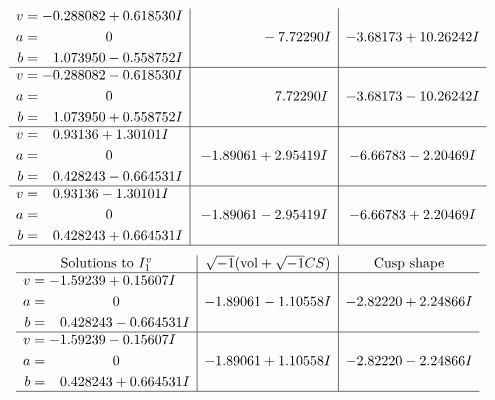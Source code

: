 \documentclass[1p]{elsarticle_modified}
\theoremstyle{definition}
\newcommand{\I}{\sqrt{-1}}
\begin{document}
$$\begin{array}{c|c|c}
\begin{aligned}
v &= -0.288082 + 0.618530 I \\
a &= \phantom{-0.000000 } 0 \\
b &= \phantom{-}1.073950 - 0.558752 I\end{aligned}
 & \phantom{-0.000000 } -7.72290 I & -3.68173 + 10.26242 I \\ \hline\begin{aligned}
v &= -0.288082 - 0.618530 I \\
a &= \phantom{-0.000000 } 0 \\
b &= \phantom{-}1.073950 + 0.558752 I\end{aligned}
 & \phantom{-0.000000 -}7.72290 I & -3.68173 - 10.26242 I \\ \hline\begin{aligned}
v &= \phantom{-}0.93136 + 1.30101 I \\
a &= \phantom{-0.000000 } 0 \\
b &= \phantom{-}0.428243 - 0.664531 I\end{aligned}
 & -1.89061 + 2.95419 I & -6.66783 - 2.20469 I \\ \hline\begin{aligned}
v &= \phantom{-}0.93136 - 1.30101 I \\
a &= \phantom{-0.000000 } 0 \\
b &= \phantom{-}0.428243 + 0.664531 I\end{aligned}
 & -1.89061 - 2.95419 I & -6.66783 + 2.20469 I\\
 \hline 
 \end{array}$$\newpage$$\begin{array}{c|c|c}  
\text{Solutions to }I^v_{1}& \I (\text{vol} + \sqrt{-1}CS) & \text{Cusp shape}\\
 \hline 
\begin{aligned}
v &= -1.59239 + 0.15607 I \\
a &= \phantom{-0.000000 } 0 \\
b &= \phantom{-}0.428243 - 0.664531 I\end{aligned}
 & -1.89061 - 1.10558 I & -2.82220 + 2.24866 I \\ \hline\begin{aligned}
v &= -1.59239 - 0.15607 I \\
a &= \phantom{-0.000000 } 0 \\
b &= \phantom{-}0.428243 + 0.664531 I\end{aligned}
 & -1.89061 + 1.10558 I & -2.82220 - 2.24866 I\\
 \hline 
 \end{array}$$\newpage
\end{document}
